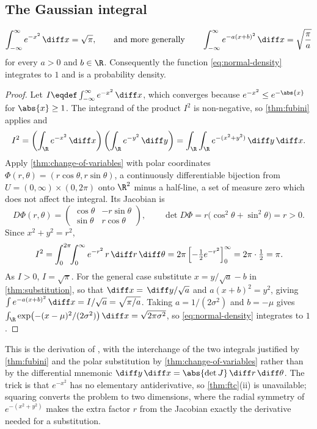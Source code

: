 \subsection{The Gaussian integral}\label{sec:int-gaussian}

\begin{proposition}\label{prop:gaussian-integral}
	\[
		\int_{-\infty}^{\infty}e^{-x^2}\,\diff x=\sqrt{\pi},
		\qquad\text{and more generally}\qquad
		\int_{-\infty}^{\infty}e^{-a(x+b)^2}\,\diff x=\sqrt{\frac{\pi}{a}}
	\]
	for every $a>0$ and $b\in\R$. Consequently the function \eqref{eq:normal-density}
	integrates to $1$ and is a probability density.
\end{proposition}

\begin{proof}
	Let $I\eqdef\int_{-\infty}^{\infty}e^{-x^2}\,\diff x$, which converges because
	$e^{-x^2}\leq e^{-\abs{x}}$ for $\abs{x}\geq1$. The integrand of the product
	$I^2$ is non-negative, so \autoref{thm:fubini} applies and
	\[
		I^2=\left(\int_{\R}e^{-x^2}\,\diff x\right)\left(\int_{\R}e^{-y^2}\,\diff y\right)
		=\int_{\R}\int_{\R}e^{-(x^2+y^2)}\,\diff y\,\diff x .
	\]
	Apply \autoref{thm:change-of-variables} with polar coordinates
	$\Phi(r,\theta)=(r\cos\theta,r\sin\theta)$, a continuously differentiable
	bijection from $U=(0,\infty)\times(0,2\pi)$ onto $\R^2$ minus a half-line, a set
	of measure zero which does not affect the integral. Its Jacobian is
	\[
		D\Phi(r,\theta)=\begin{pmatrix}
			\cos\theta & -r\sin\theta \\
			\sin\theta & r\cos\theta
		\end{pmatrix},
		\qquad
		\det D\Phi=r\bigl(\cos^2\theta+\sin^2\theta\bigr)=r>0 .
	\]
	Since $x^2+y^2=r^2$,
	\[
		I^2=\int_0^{2\pi}\!\!\int_0^{\infty}e^{-r^2}\,r\,\diff r\,\diff \theta
		=2\pi\left[-\tfrac12e^{-r^2}\right]_0^{\infty}=2\pi\cdot\tfrac12=\pi .
	\]
	As $I>0$, $I=\sqrt\pi$. For the general case substitute
	$x=y/\sqrt a-b$ in \autoref{thm:substitution}, so that $\diff x=\,\diff y/\sqrt a$ and
	$a(x+b)^2=y^2$, giving $\int e^{-a(x+b)^2}\,\diff x=I/\sqrt a=\sqrt{\pi/a}$. Taking
	$a=1/(2\sigma^2)$ and $b=-\mu$ gives
	$\int_{\R}\exp\bigl(-(x-\mu)^2/(2\sigma^2)\bigr)\,\diff x=\sqrt{2\pi\sigma^2}$, so
	\eqref{eq:normal-density} integrates to $1$.
\end{proof}

This is the derivation of \autocite[slides 89--93]{fukuda2026calculus}, with the
interchange of the two integrals justified by \autoref{thm:fubini} and the polar
substitution by \autoref{thm:change-of-variables} rather than by the differential
mnemonic $\diff y\,\diff x=\abs{\det J}\,\diff r\,\diff \theta$. The trick is that
$e^{-x^2}$ has no elementary antiderivative, so \autoref{thm:ftc}(ii) is
unavailable; squaring converts the problem to two dimensions, where the radial
symmetry of $e^{-(x^2+y^2)}$ makes the extra factor $r$ from the Jacobian
exactly the derivative needed for a substitution.

